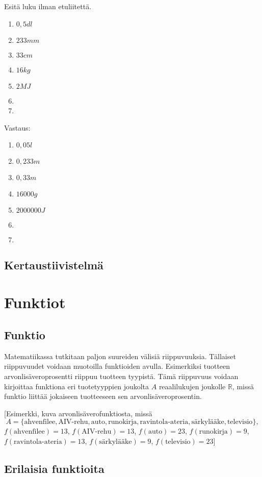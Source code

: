 \begin{tehtava}
Esitä luku ilman etuliitettä.
\begin{enumerate}
\item $0,5 dl$
\item $233 mm$
\item $33 cm$
\item $16 kg$
\item $2 MJ$
\item %
\item 
\end{enumerate}
\begin{vastaus}
Vastaus:
\begin{enumerate}
\item $0,05 l$
\item $0,233 m$
\item $0,33 m$
\item $16 000 g$
\item $2 000 000 J$
\item $ $
\item $ $
\end{enumerate}
\end{vastaus}
\end{tehtava}


\chapter{Kertaustiivistelmä}

\part{Funktiot}
\chapter{Funktio}
Matematiikassa tutkitaan paljon suureiden välisiä riippuvuuksia. Tällaiset riippuvuudet voidaan muotoilla funktioiden avulla. Esimerkiksi tuotteen arvonlisäveroprosentti riippuu tuotteen tyypistä. Tämä riippuvuus voidaan kirjoittaa funktiona eri tuotetyyppien joukolta $A$ reaalilukujen joukolle $\mathbb{R}$, missä funktio liittää jokaiseen tuotteeseen sen arvonlisäveroprosentin.

[Esimerkki, kuva arvonlisäverofunktiosta, missä \[A = \{\text{ahvenfilee}, \text{AIV-rehu}, \text{auto}, \text{runokirja}, \text{ravintola-ateria}, \text{särkylääke}, \text{televisio}\},\]$f(\text{ahvenfilee}) = 13$, $f(\text{AIV-rehu}) = 13$, $f(\text{auto}) = 23$, $f(\text{runokirja}) = 9$, $f(\text{ravintola-ateria}) = 13$, $f(\text{särkylääke}) = 9$, $f(\text{televisio}) = 23$]




\chapter{Erilaisia funktioita}
